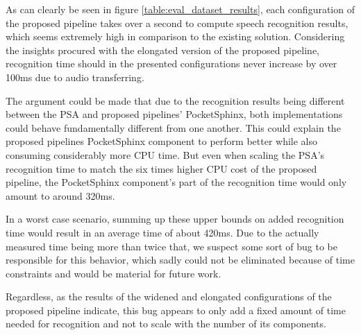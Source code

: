 { %
As can clearly be seen in figure \ref{table:eval_dataset_results}, each configuration of the proposed pipeline takes over a second to compute speech recognition results, which seems extremely high in comparison to the existing solution.
Considering the insights procured with the elongated version of the proposed pipeline, recognition time should in the presented configurations never increase by over 100ms due to audio transferring.

The argument could be made that due to the recognition results being different between the PSA and proposed pipelines' PocketSphinx, both implementations could behave fundamentally different from one another.
This could explain the proposed pipelines PocketSphinx component to perform better while also consuming considerably more CPU time.
But even when scaling the PSA's recognition time to match the six times higher CPU cost of the proposed pipeline, the PocketSphinx component's part of the recognition time would only amount to around 320ms.

In a worst case scenario, summing up these upper bounds on added recognition time would result in an average time of about 420ms.  
Due to the actually measured time being more than twice that, we suspect some sort of bug to be responsible for this behavior, which sadly could not be eliminated because of time constraints and would be material for future work.

Regardless, as the results of the widened and elongated configurations of the proposed pipeline indicate, this bug appears to only add a fixed amount of time needed for recognition and not to scale with the number of its components. 
}





